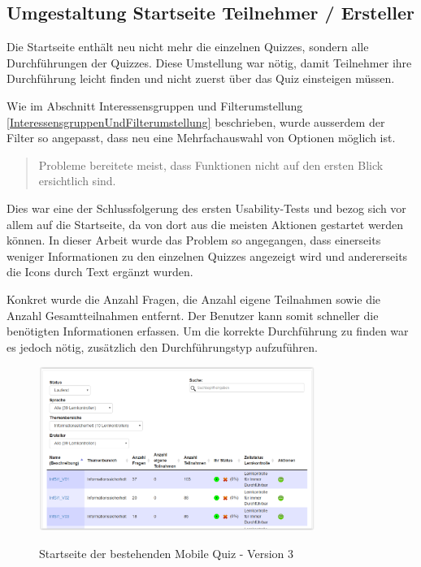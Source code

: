 \subsection{Umgestaltung Startseite Teilnehmer / Ersteller}

Die Startseite enthält neu nicht mehr die einzelnen Quizzes, sondern alle Durchführungen der Quizzes. Diese Umstellung war nötig, damit Teilnehmer ihre Durchführung leicht finden und nicht zuerst über das Quiz einsteigen müssen.

Wie im Abschnitt Interessensgruppen und Filterumstellung \ref{InteressensgruppenUndFilterumstellung} beschrieben, wurde ausserdem der Filter so angepasst, dass neu eine Mehrfachauswahl von Optionen möglich ist.

\bigskip\bigskip

\begin{quote}
	\glqq Probleme bereitete meist, dass Funktionen nicht auf den ersten Blick ersichtlich sind.\grqq
\end{quote}

Dies war eine der Schlussfolgerung des ersten \gls{Usability-Test}s und bezog sich vor allem auf die Startseite, da von dort aus die meisten Aktionen gestartet werden können. In dieser Arbeit wurde das Problem so angegangen, dass einerseits weniger Informationen zu den einzelnen Quizzes angezeigt wird und andererseits die Icons durch Text ergänzt wurden.

Konkret wurde die Anzahl Fragen, die Anzahl eigene Teilnahmen sowie die Anzahl Gesamtteilnahmen entfernt. Der Benutzer kann somit schneller die benötigten Informationen erfassen. Um die korrekte Durchführung zu finden war es jedoch nötig, zusätzlich den Durchführungstyp aufzuführen. 


\begin{figure}[H]
	\centering
	\includegraphics[width=0.8\textwidth]{Images/Startseite_alt.PNG}
	\caption{Startseite der bestehenden Mobile Quiz - Version 3}
	\cite{mobilequiz.ch}
\end{figure}



